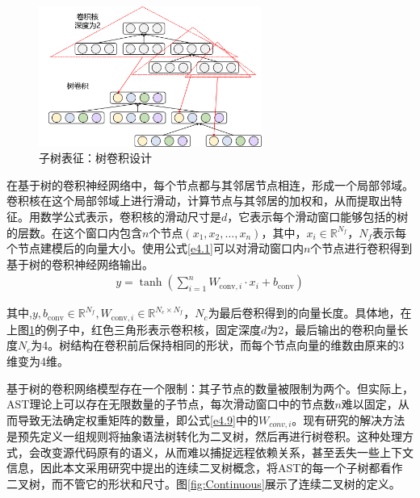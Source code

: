 \begin{figure}[H]
  \centering
  \includegraphics[width=0.65\textwidth]{figures/TreeBaseConvolution.png}
  \caption{子树表征：树卷积设计}\label{fig:TreeBaseConvolution}
\end{figure}

在基于树的卷积神经网络中，每个节点都与其邻居节点相连，形成一个局部邻域。卷积核在这个局部邻域上进行滑动，计算节点与其邻居的加权和，从而提取出特征。用数学公式表示，卷积核的滑动尺寸是$d$，它表示每个滑动窗口能够包括的树的层数。在这个窗口内包含$n$个节点$\left(x_1,x_2,\ldots,x_n\right)$，其中，$x_i \in \mathbb{R}^{N_{f}}$，$N_{f}$表示每个节点建模后的向量大小。使用公式\ref{e4.1}可以对滑动窗口内$n$个节点进行卷积得到基于树的卷积神经网络输出。
\begin{equation}\label{e4.1}
  \begin{split}
    y = \tanh \left(\sum_{i=1}^{n} W_{\text{conv}, i} \cdot x_{i}+b_{\text{conv}}\right)
  \end{split}
\end{equation}

其中,$y, b_{\text{conv}} \in \mathbb{R}^{N_{f}}, W_{\text{conv}, i} \in \mathbb{R}^{N_{c} \times N_{f}}$，$N_{c}$为最后卷积得到的向量长度。具体地，在上图\ref{fig:TreeBaseConvolution}的例子中，红色三角形表示卷积核，固定深度$d$为2，最后输出的卷积向量长度$N_{c}$为4。树结构在卷积前后保持相同的形状，而每个节点向量的维数由原来的3维变为4维。

基于树的卷积网络模型存在一个限制：其子节点的数量被限制为两个。但实际上，AST理论上可以存在无限数量的子节点，每次滑动窗口中的节点数$n$难以固定，从而导致无法确定权重矩阵的数量，即公式\ref{e4.9}中的$W_{conv,i}$。现有研究的解决方法是预先定义一组规则将抽象语法树转化为二叉树，然后再进行树卷积。这种处理方式，会改变源代码原有的语义，从而难以捕捉远程依赖关系，甚至丢失一些上下文信息，因此本文采用研究\cite{8813290}中提出的连续二叉树概念，将AST的每一个子树都看作二叉树，而不管它的形状和尺寸。图\ref{fig:Continuous}展示了连续二叉树的定义。

